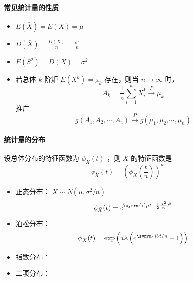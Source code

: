 \paragraph{常见统计量的性质}
\begin{itemize}[leftmargin=\paritemindent]
    \item $ E(\bar{X}) = E(X) = \mu $
    \item $ D(\bar{X}) = \frac{D(X)}{n} = \frac{\sigma^2}{n} $
    \item $ E(S^2) = D(X) = \sigma^2 $
    \item 若总体 $ k $ 阶矩 $ E(X^k) = \mu_k $ 存在，则当 $ n \rightarrow \infty $ 时，
    \begin{equation}
        A_k = \frac{1}{n} \sum_{i=1}^{n} X_i^k \xrightarrow{P} \mu_k
    \end{equation}
    推广
    \begin{equation}
        g(A_1, A_2, \cdots, A_n) \xrightarrow{P} g(\mu_1, \mu_2, \cdots, \mu_n)
    \end{equation}
\end{itemize}

\paragraph{统计量的分布} 设总体分布的特征函数为 $ \phi_X(t) $ ，则 $ \bar{X} $ 的特征函数是
\begin{equation}
    \phi_{\bar{X}}(t) = \left(\phi_X\left(\frac{t}{n}\right)\right)^n
\end{equation}
\begin{itemize}[leftmargin=\paritemindent]
    \item 正态分布： $ \bar{X} \sim N(\mu, \sigma^2 / n) $
    $$ \phi_{\bar{X}}(t) = e^{\symrm{i}\mu t - \frac{1}{2} \frac{\sigma^2}{n} t^2} $$
    \item 泊松分布：
    $$ \phi_{\bar{X}}(t) = \exp \left( n\lambda \left(e^{\symrm{i}t/n} - 1\right) \right) $$
    \item 指数分布：
    \item 二项分布：
\end{itemize}
